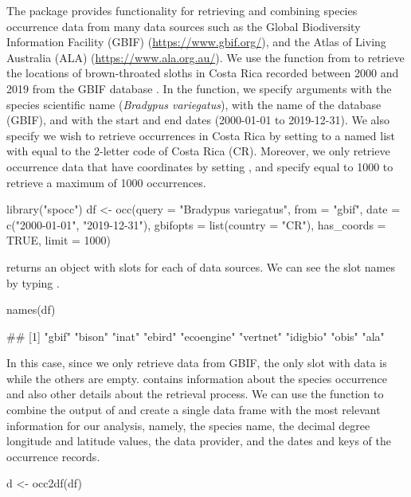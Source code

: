 The  package provides functionality for retrieving and combining species occurrence data from many data sources such as the Global Biodiversity Information Facility (GBIF) (\url{https://www.gbif.org/}), and the Atlas of Living Australia (ALA) (\url{https://www.ala.org.au/}).
We use the  function from  to retrieve the locations of brown-throated sloths in Costa Rica recorded between 2000 and 2019 from the GBIF database \citep{gbif1, gbif2}.
In the function, we specify arguments  with the species scientific name ({\em{Bradypus variegatus}}),  with the name of the database (GBIF), and  with the start and end dates (2000-01-01 to 2019-12-31).
We also specify we wish to retrieve occurrences in Costa Rica by setting  to a named list with
 equal to the 2-letter code of Costa Rica (CR).
Moreover, we only retrieve occurrence data that have coordinates by setting , and specify  equal to 1000 to retrieve a maximum of 1000 occurrences.


\begin{example}
library("spocc")
df <- occ(query = "Bradypus variegatus", from = "gbif",
          date = c("2000-01-01", "2019-12-31"),
          gbifopts = list(country = "CR"),
          has_coords = TRUE, limit = 1000)
\end{example}

 returns an object with slots for each of data sources. We can see the slot names by typing .

\begin{example}
names(df)

## [1] "gbif" "bison" "inat" "ebird" "ecoengine" "vertnet" "idigbio" "obis" "ala"
\end{example}

In this case, since we only retrieve data from GBIF, the only slot with data is  while the others are empty.
 contains information about the species occurrence and also other details about the retrieval process.
We can use the  function to combine the output of  and create a single data frame with the most relevant information for our analysis, namely, the species name, the decimal degree longitude and latitude values, the data provider, and the dates and keys of the occurrence records.

\begin{example}
d <- occ2df(df)
\end{example}

